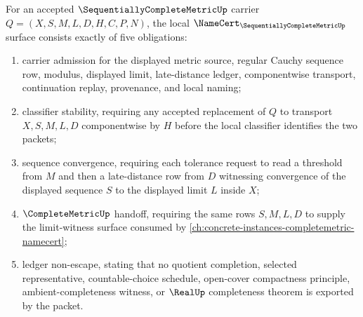 \begin{theorem}
\label{thm:sequentially-complete-metric-namecert-obligations}
For an accepted $\SequentiallyCompleteMetricUp$ carrier $Q=(X,S,M,L,D,H,C,P,N)$, the local $\NameCert_{\SequentiallyCompleteMetricUp}$ surface consists exactly of five obligations:
\begin{enumerate}
\item carrier admission for the displayed metric source, regular Cauchy sequence row, modulus, displayed limit, late-distance ledger, componentwise transport, continuation replay, provenance, and local naming;
\item classifier stability, requiring any accepted replacement of $Q$ to transport $X,S,M,L,D$ componentwise by $H$ before the local classifier identifies the two packets;
\item sequence convergence, requiring each tolerance request to read a threshold from $M$ and then a late-distance row from $D$ witnessing convergence of the displayed sequence $S$ to the displayed limit $L$ inside $X$;
\item $\CompleteMetricUp$ handoff, requiring the same rows $S,M,L,D$ to supply the limit-witness surface consumed by \autoref{ch:concrete-instances-completemetric-namecert};
\item ledger non-escape, stating that no quotient completion, selected representative, countable-choice schedule, open-cover compactness principle, ambient-completeness witness, or $\RealUp$ completeness theorem is exported by the packet.
\end{enumerate}
\end{theorem}
